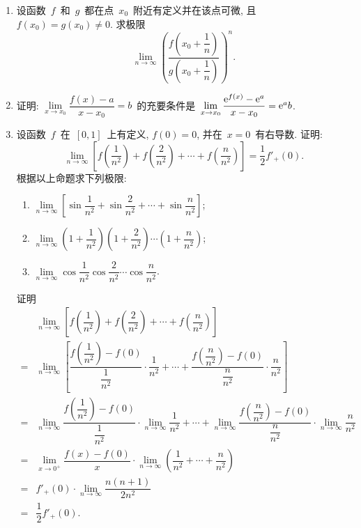 \documentclass[UTF8,a4paper,20pt]{article}
\begin{document}
\begin{enumerate}
\item 设函数~$f$~和~$g$~都在点~$x_0$~附近有定义并在该点可微, 且~$f(x_0)=g(x_0)\neq 0$. 求极限
\[ \lim\limits_{n\to\infty}\left(\dfrac{f\left(x_0+\dfrac{1}{n}\right)}{g\left(x_0+\dfrac{1}{n}\right)}\right)^n.\]

\item 证明: $\lim\limits_{x\to x_0}\dfrac{f(x)-a}{x-x_0}=b$~的充要条件是~$\lim\limits_{x\to x_0}\dfrac{\mathrm{e}^{f(x)}-\mathrm{e}^a}{x-x_0}=\mathrm{e}^ab$.

\item 设函数~$f$~在~$[0,1]$~上有定义, $f(0)=0$, 并在~$x=0$~有右导数. 证明:
\[ \lim\limits_{n\to\infty}\left[f\left(\dfrac{1}{n^2}\right)+f\left(\dfrac{2}{n^2}\right)+\cdots+f\left(\dfrac{n}{n^2}\right)\right]=\dfrac{1}{2}f'_{+}(0).\]
根据以上命题求下列极限:
	\begin{enumerate}[(1)]
	\item $\lim\limits_{n\to\infty}\left[\sin{\dfrac{1}{n^2}}+\sin{\dfrac{2}{n^2}}+\cdots+\sin{\dfrac{n}{n^2}}\right]$;
	\item $\lim\limits_{n\to\infty}\left(1+\dfrac{1}{n^2}\right)\left(1+\dfrac{2}{n^2}\right)\cdots\left(1+\dfrac{n}{n^2}\right)$;
	\item $\lim\limits_{n\to\infty}\cos{\dfrac{1}{n^2}}\cos{\dfrac{2}{n^2}}\cdots\cos{\dfrac{n}{n^2}}$.
	\end{enumerate}
{\heiti 证明}\\
\begin{equation*}
	\begin{split}
	&\lim\limits_{n\to\infty}\left[f\left(\dfrac{1}{n^2}\right)+f\left(\dfrac{2}{n^2}\right)+\cdots+f\left(\dfrac{n}{n^2}\right)\right]\\
	=&\lim\limits_{n\to\infty}\left[\dfrac{f\left(\dfrac{1}{n^2}\right)-f(0)}{\dfrac{1}{n^2}}\cdot\dfrac{1}{n^2}+\cdots+\dfrac{f\left(\dfrac{n}{n^2}\right)-f(0)}{\dfrac{n}{n^2}}\cdot\dfrac{n}{n^2}\right]\\
	=&\lim\limits_{n\to\infty}\dfrac{f\left(\dfrac{1}{n^2}\right)-f(0)}{\dfrac{1}{n^2}}\cdot\lim\limits_{n\to\infty}\dfrac{1}{n^2}+\cdots+\lim\limits_{n\to\infty}\dfrac{f\left(\dfrac{n}{n^2}\right)-f(0)}{\dfrac{n}{n^2}}\cdot\lim\limits_{n\to\infty}\dfrac{n}{n^2}\\
	=&\lim\limits_{x\to0^{+}}\dfrac{f(x)-f(0)}{x}\cdot\lim\limits_{n\to\infty}\left(\dfrac{1}{n^2}+\cdots+\dfrac{n}{n^2}\right)\\
	=&f'_{+}(0)\cdot\lim\limits_{n\to\infty}\dfrac{n(n+1)}{2n^2}\\
	=&\dfrac{1}{2}f'_{+}(0).
	\end{split}

\end{equation*}
\end{enumerate}
\end{document}
